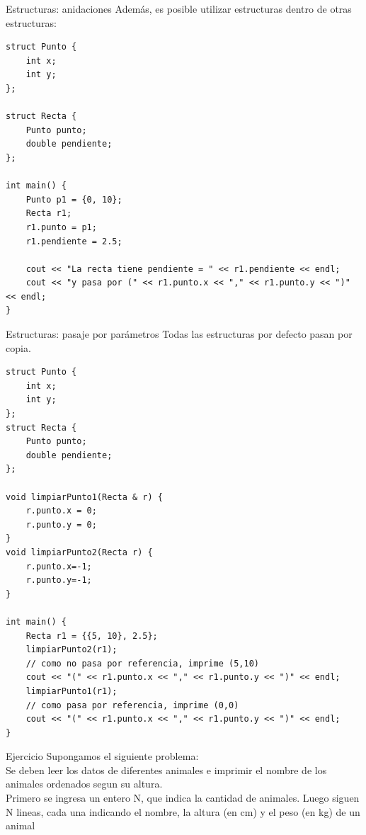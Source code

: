 \documentclass[12pt]{beamer}
\begin{document}
\begin{frame}[fragile]{Estructuras: anidaciones}
    Además, es posible utilizar estructuras dentro de otras estructuras:

    \medskip
\begin{lstlisting}[basicstyle=\tiny]
struct Punto {
    int x;
    int y;
};

struct Recta {
    Punto punto;
    double pendiente;
};

int main() {
    Punto p1 = {0, 10};
    Recta r1;
    r1.punto = p1;
    r1.pendiente = 2.5;

    cout << "La recta tiene pendiente = " << r1.pendiente << endl;
    cout << "y pasa por (" << r1.punto.x << "," << r1.punto.y << ")" << endl;
}
\end{lstlisting}
\end{frame}

\begin{frame}[fragile]{Estructuras: pasaje por parámetros}
    \centering Todas las estructuras por defecto \alert{pasan por copia}.

    \medskip
\begin{lstlisting}[basicstyle=\tiny]
struct Punto {
    int x;
    int y;
};
struct Recta {
    Punto punto;
    double pendiente;
};

void limpiarPunto1(Recta & r) {
    r.punto.x = 0;
    r.punto.y = 0;
}
void limpiarPunto2(Recta r) {
    r.punto.x=-1;
    r.punto.y=-1;
}

int main() {
    Recta r1 = {{5, 10}, 2.5};
    limpiarPunto2(r1);
    // como no pasa por referencia, imprime (5,10)
    cout << "(" << r1.punto.x << "," << r1.punto.y << ")" << endl;
    limpiarPunto1(r1);
    // como pasa por referencia, imprime (0,0)
    cout << "(" << r1.punto.x << "," << r1.punto.y << ")" << endl;
}
\end{lstlisting}
\end{frame}

\begin{frame}{Ejercicio}
    Supongamos el siguiente problema: \\
    \medskip
    Se deben leer los datos de diferentes animales e imprimir el nombre de los animales \alert{ordenados segun su altura}. \\
    \medskip
    Primero se ingresa un entero N, que indica la cantidad de animales. Luego siguen N lineas, cada una indicando el nombre, la altura (en cm) y el peso (en kg) de un animal
\end{frame}
\end{document}
